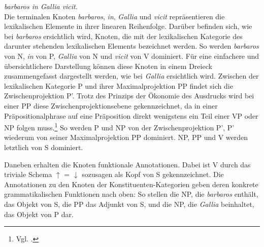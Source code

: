 \documentclass[12pt,a4paper]{article}
\begin{document}
\textit{barbaros in Gallia vicit.} \\

Die terminalen Knoten \textit{barbaros}, \textit{in}, \textit{Gallia} und \textit{vicit} repräsentieren die lexikalischen Elemente in ihrer linearen Reihenfolge. Darüber befinden sich, wie bei \textit{barbaros} ersichtlich wird, Knoten, die mit der lexikalischen Kategorie des darunter stehenden lexikalischen Elements bezeichnet werden. So werden \textit{barbaros} von N, \textit{in} von P, \textit{Gallia} von N und \textit{vicit} von V dominiert. Für eine einfachere und übersichtlichere Darstellung können diese Knoten in einem Dreieck zusammengefasst dargestellt werden, wie bei \textit{Gallia} ersichtlich wird. Zwischen der lexikalischen Kategorie P und ihrer Maximalprojektion PP findet sich die Zwischenprojektion P'. Trotz des Prinzips der Ökonomie des Ausdrucks wird bei einer PP diese Zwischenprojektionsebene gekennzeichnet,  da in einer Präpositionalphrase auf eine Präposition direkt wenigstens ein Teil einer VP oder NP folgen muss.\footnote{Vgl. \cite{Snijders}.} So werden P und NP von der Zwischenprojektion P', P' wiederum von seiner Maximalprojektion PP dominiert. NP, PP und V werden letztlich von S dominiert.

Daneben erhalten die Knoten funktionale Annotationen. Dabei ist V durch das triviale Schema $\uparrow$ = $\downarrow$ sozusagen als Kopf von S gekennzeichnet. Die Annotationen zu den Knoten der Konstituenten-Kategorien geben deren konkrete grammatikalischen Funktionen nach oben: So stellen die NP, die \textit{barbaros} enthält, das Objekt von S, die PP das Adjunkt von S, und die NP, die \textit{Gallia} beinhaltet, das Objekt von P dar.
\end{document}
